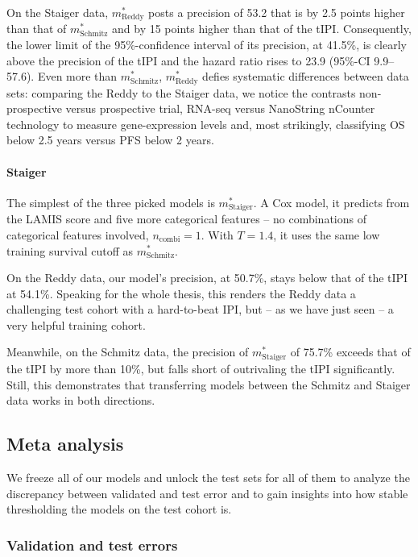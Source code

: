 On the Staiger data, $m^*_\text{Reddy}$ posts a precision of \num{53.2} that is by \num{2.5} 
points higher than that of $m^*_\text{Schmitz}$ and by \num{15} points higher than that of the tIPI. 
Consequently, the lower limit of the \num{95}\%-confidence interval of its precision, at 
\num{41.5}\%, is 
clearly above the precision of the tIPI and the hazard ratio rises to \num{23.9}
(\num{95}\%-CI \num{9.9}--\num{57.6}). Even more than $m^*_\text{Schmitz}$, $m^*_\text{Reddy}$ 
defies systematic differences between data sets: comparing the Reddy to the Staiger data, we 
notice the contrasts non-prospective versus prospective trial, 
RNA-seq versus NanoString nCounter technology to measure gene-expression levels and, most strikingly, 
classifying OS below \num{2.5} years versus PFS below \num{2} years.

\paragraph{Staiger}
The simplest of the three picked models is $m^*_\text{Staiger}$. A Cox model, it predicts from 
the LAMIS score and five more categorical features -- no combinations of categorical features involved, 
$n_\text{combi} = 1$. With $T = \num{1.4}$, it uses the same low training survival cutoff as 
$m^*_\text{Schmitz}$.

On the Reddy data, our model's precision, at \num{50.7}\%, stays below that of the tIPI at \num{54.1}\%. 
Speaking for the whole thesis, this renders the Reddy data a challenging test cohort with a 
hard-to-beat IPI, but -- as we have just seen -- a very helpful training cohort.

Meanwhile, on the Schmitz data, the precision of $m^*_\text{Staiger}$ of \num{75.7}\% exceeds that 
of the tIPI by more than \num{10}\%, but falls short of outrivaling the tIPI significantly. Still, 
this demonstrates that transferring models between the Schmitz and Staiger data works in both 
directions.

\subsection{Meta analysis}\label{subsec:results-inter-meta}

We freeze all of our models and unlock the test sets for all of them to analyze the discrepancy 
between validated and test error and to gain insights into how stable thresholding the models on the 
test cohort is.

\subsubsection{Validation and test errors}

